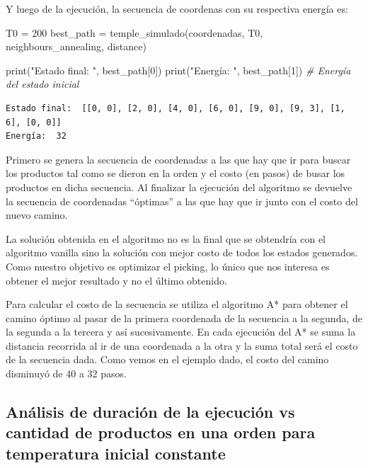 \documentclass[
]{article}
\newenvironment{Shaded}{}{}
\newcommand{\BuiltInTok}[1]{#1}
\newcommand{\CommentTok}[1]{\textcolor[rgb]{0.38,0.63,0.69}{\textit{#1}}}
\newcommand{\DecValTok}[1]{\textcolor[rgb]{0.25,0.63,0.44}{#1}}
\newcommand{\NormalTok}[1]{#1}
\newcommand{\OperatorTok}[1]{\textcolor[rgb]{0.40,0.40,0.40}{#1}}
\newcommand{\StringTok}[1]{\textcolor[rgb]{0.25,0.44,0.63}{#1}}
\begin{document}
Y luego de la ejecución, la secuencia de coordenas con su respectiva
energía es:

\begin{Shaded}
\begin{Highlighting}[]
\NormalTok{T0 }\OperatorTok{=} \DecValTok{200}
\NormalTok{best_path }\OperatorTok{=}\NormalTok{ temple_simulado(coordenadas, T0, neighbours_annealing, distance)}

\BuiltInTok{print}\NormalTok{(}\StringTok{"Estado final: "}\NormalTok{, best_path[}\DecValTok{0}\NormalTok{])}
\BuiltInTok{print}\NormalTok{(}\StringTok{"Energía: "}\NormalTok{, best_path[}\DecValTok{1}\NormalTok{]) }\CommentTok{# Energía del estado inicial}
\end{Highlighting}
\end{Shaded}

\begin{verbatim}
Estado final:  [[0, 0], [2, 0], [4, 0], [6, 0], [9, 0], [9, 3], [1, 6], [0, 0]]
Energía:  32
\end{verbatim}

Primero se genera la secuencia de coordenadas a las que hay que ir para
buscar los productos tal como se dieron en la orden y el costo (en
pasos) de busar los productos en dicha secuencia. Al finalizar la
ejecución del algoritmo se devuelve la secuencia de coordenadas
``óptimas'' a las que hay que ir junto con el costo del nuevo camino.

La solución obtenida en el algoritmo no es la final que se obtendría con
el algoritmo vanilla sino la solución con mejor costo de todos los
estados generados. Como nuestro objetivo es optimizar el picking, lo
único que nos interesa es obtener el mejor resultado y no el último
obtenido.

Para calcular el costo de la secuencia se utiliza el algoritmo A* para
obtener el camino óptimo al pasar de la primera coordenada de la
secuencia a la segunda, de la segunda a la tercera y así sucesivamente.
En cada ejecución del A* se suma la distancia recorrida al ir de una
coordenada a la otra y la suma total será el costo de la secuencia dada.
Como vemos en el ejemplo dado, el costo del camino disminuyó de 40 a 32
pasos.

\hypertarget{anuxe1lisis-de-duraciuxf3n-de-la-ejecuciuxf3n-vs-cantidad-de-productos-en-una-orden-para-temperatura-inicial-constante}{%
\subsection{Análisis de duración de la ejecución vs cantidad de
productos en una orden para temperatura inicial
constante}\label{anuxe1lisis-de-duraciuxf3n-de-la-ejecuciuxf3n-vs-cantidad-de-productos-en-una-orden-para-temperatura-inicial-constante}}
\end{document}
